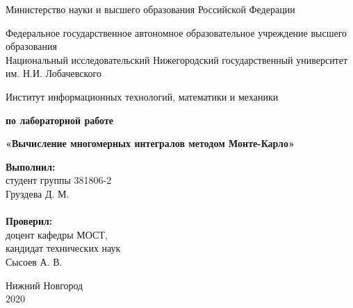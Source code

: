 \documentclass{report}
\begin{document}
\begin{titlepage}

\begin{center}
Министерство науки и высшего образования Российской Федерации
\end{center}

\begin{center}
Федеральное государственное автономное образовательное учреждение высшего образования \\
Национальный исследовательский Нижегородский государственный университет им. Н.И. Лобачевского
\end{center}

\begin{center}
Институт информационных технологий, математики и механики
\end{center}

\vspace{4em}

\begin{center}
\textbf{ по лабораторной работе} \\
\end{center}
\begin{center}
\textbf{\Large«Вычисление многомерных интегралов методом Монте-Карло»} \\
\end{center}

\vspace{4em}

\newbox{\lbox}
\newlength{\maxl}
\setlength{\maxl}{\wd\lbox}
\hfill\parbox{7cm}{
\hspace*{5cm}\hspace*{-5cm}\textbf{Выполнил:} \\ студент группы 381806-2 \\ Груздева Д. М.\\
\\
\hspace*{5cm}\hspace*{-5cm}\textbf{Проверил:}\\ доцент кафедры МОСТ, \\ кандидат технических наук \\ Сысоев А. В.\\
}
\vspace{\fill}

\begin{center} Нижний Новгород \\ 2020 \end{center}

\end{titlepage}
\end{document}
